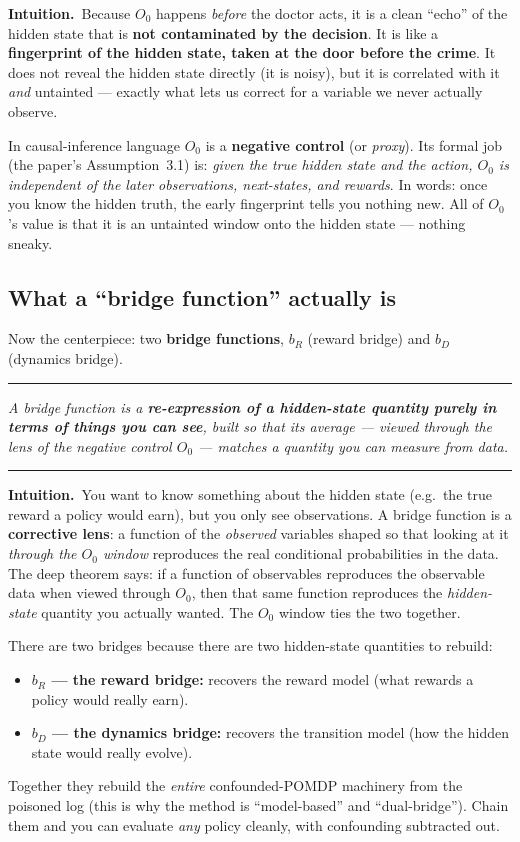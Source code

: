 \documentclass[11pt]{article}
\newenvironment{takeaway}
  {\par\vspace{4pt}\noindent\begin{center}\begin{minipage}{0.94\linewidth}%
   \color{black!88}\rule{\linewidth}{0.7pt}\par\vspace{3pt}\small\itshape}
  {\par\vspace{3pt}\rule{\linewidth}{0.7pt}\end{minipage}\end{center}\vspace{4pt}}
\newcommand{\intuition}[1]{\vspace{2pt}\noindent\textbf{Intuition.}\ #1\par\vspace{2pt}}
\newcommand{\Ob}{O_0}
\begin{document}
\intuition{Because $\Ob$ happens \emph{before} the doctor acts, it is a clean
``echo'' of the hidden state that is \textbf{not contaminated by the decision}. It is
like a \textbf{fingerprint of the hidden state, taken at the door before the crime}.
It does not reveal the hidden state directly (it is noisy), but it is correlated with
it \emph{and} untainted --- exactly what lets us correct for a variable we never
actually observe.}

In causal-inference language $\Ob$ is a \textbf{negative control} (or \emph{proxy}).
Its formal job (the paper's Assumption~3.1) is: \emph{given the true hidden state and
the action, $\Ob$ is independent of the later observations, next-states, and
rewards}. In words: once you know the hidden truth, the early fingerprint tells you
nothing new. All of $\Ob$'s value is that it is an untainted window onto the hidden
state --- nothing sneaky.

\subsection{What a ``bridge function'' actually is}
Now the centerpiece: two \textbf{bridge functions}, $b_R$ (reward bridge) and $b_D$
(dynamics bridge).

\begin{takeaway}
A bridge function is a \textbf{re-expression of a hidden-state quantity purely in
terms of things you can see}, built so that its average --- \emph{viewed through the
lens of the negative control $\Ob$} --- matches a quantity you can measure from data.
\end{takeaway}

\intuition{You want to know something about the hidden state (e.g.\ the true reward a
policy would earn), but you only see observations. A bridge function is a
\textbf{corrective lens}: a function of the \emph{observed} variables shaped so that
looking at it \emph{through the $\Ob$ window} reproduces the real conditional
probabilities in the data. The deep theorem says: if a function of observables
reproduces the observable data when viewed through $\Ob$, then that same function
reproduces the \emph{hidden-state} quantity you actually wanted. The $\Ob$ window ties
the two together.}

There are two bridges because there are two hidden-state quantities to rebuild:
\begin{itemize}
  \item \textbf{$b_R$ --- the reward bridge:} recovers the reward model (what rewards
  a policy would really earn).
  \item \textbf{$b_D$ --- the dynamics bridge:} recovers the transition model (how the
  hidden state would really evolve).
\end{itemize}
Together they rebuild the \emph{entire} confounded-POMDP machinery from the poisoned
log (this is why the method is ``model-based'' and ``dual-bridge''). Chain them and
you can evaluate \emph{any} policy cleanly, with confounding subtracted out.
\end{document}
